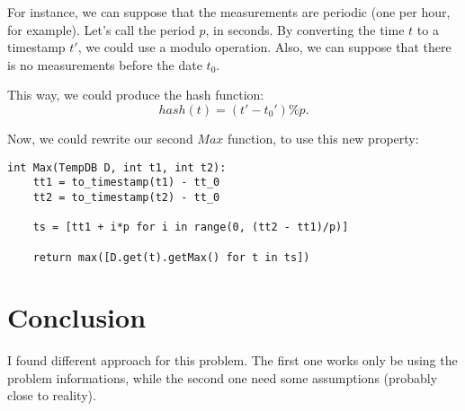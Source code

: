		For instance, we can suppose that the measurements are periodic (one per hour, for example). Let's call the period $p$, in seconds.
		By converting the time $t$ to a timestamp $t'$, we could use a modulo operation.
		Also, we can suppose that there is no measurements before the date $t_0$.

		This way, we could produce the hash function:\[hash(t) = (t' - t_0') \% p .\]

		Now, we could rewrite our second $Max$ function, to use this new property:
\begin{lstlisting}
int Max(TempDB D, int t1, int t2):
	tt1 = to_timestamp(t1) - tt_0
	tt2 = to_timestamp(t2) - tt_0

	ts = [tt1 + i*p for i in range(0, (tt2 - tt1)/p)]

	return max([D.get(t).getMax() for t in ts])
\end{lstlisting}

\section{Conclusion}
	I found different approach for this problem. The first one works only be using the problem informations, while the second one need some assumptions (probably close to reality).